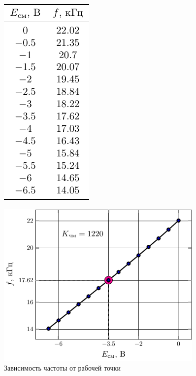 \documentclass[a4paper,12pt]{article}
\begin{document}
\begin{figure}[H]
\centering
\begin{minipage}{0.99\linewidth} 
\begin{minipage}{0.3\linewidth} 
\centering
\begin{table}[H]
	\label{tab:1}
	\centering
	\vspace{5pt}
	\includegraphics[scale=1.2]{plot/tab1.pdf}
	\vspace{4.5em}
\end{table}
\end{minipage} 
\begin{minipage}{0.7\linewidth} 
	\centering
	\includegraphics[width=0.9\textwidth]{plot/ef.pdf}
\end{minipage}
\end{minipage}
\vspace{-2em}
\label{fig:exp1}
\caption{Зависимость частоты от рабочей точки}
\end{figure}
\end{document}
